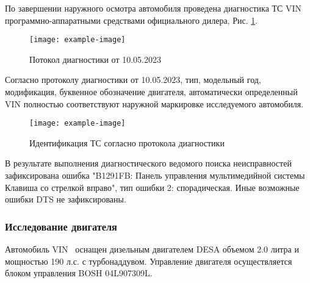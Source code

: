     По завершении наружного осмотра автомобиля проведена диагностика ТС VIN \vin\, программно-аппаратными средствами   официального дилера, Рис. \ref{пд}.
       \begin{figure}[H]
    	\centering
    	\texttt{[image: example-image]}
    	\caption{Потокол диагностики от 10.05.2023}
    	\label{пд}
    \end{figure}
    
      Согласно протоколу диагностики от 10.05.2023, тип, модельный год, модификация, буквенное обозначение двигателя, автоматически определенный VIN полностью соответствуют наружной маркировке исследуемого автомобиля.
   
   \begin{figure}[H]
   	\centering
   	\texttt{[image: example-image]}
   	\caption{Идентификация ТС согласно протокола диагностики}
   	\label{модельсканер}
   \end{figure}
   
   В результате выполнения диагностического ведомого поиска неисправностей  зафиксирована ошибка "B1291FB:  Панель управления мультимедийной системы Клавиша со стрелкой вправо", тип ошибки 2: спорадическая. Иные  возможные  ошибки DTS не зафиксированы. \\
   
\subsubsection{Исследование двигателя}
     
 Автомобиль  VIN \vin \, оснащен  дизельным двигателем DESA объемом 2.0 литра и мощностью 190 л.с. с турбонаддувом. Управление двигателя осуществляется блоком управления BOSH 04L907309L. 
  
